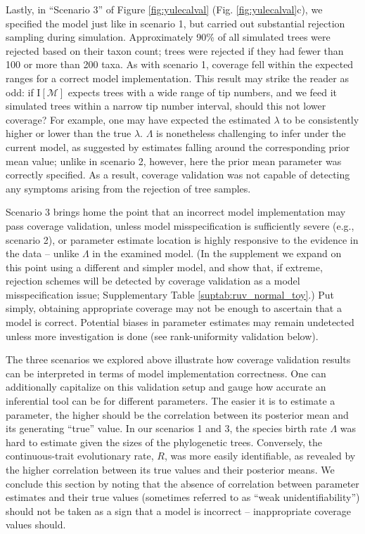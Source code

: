 \documentclass[oneside]{article}
\begin{document}
Lastly, in ``Scenario 3'' of Figure \ref{fig:yulecalval} (Fig. \ref{fig:yulecalval}c), we specified the model just like in scenario 1, but carried out substantial rejection sampling during simulation.
Approximately 90\% of all simulated trees were rejected based on their taxon count; trees were rejected if they had fewer than 100 or more than 200 taxa.
As with scenario 1, coverage fell within the expected ranges for a correct model implementation.
This result may strike the reader as odd: if $\text{I}[\mathcal{M}]$ expects trees with a wide range of tip numbers, and we feed it simulated trees within a narrow tip number interval, should this not lower coverage?
For example, one may have expected the estimated $\lambda$ to be consistently higher or lower than the true $\lambda$.
$\Lambda$ is nonetheless challenging to infer under the current model, as suggested by estimates falling around the corresponding prior mean value; unlike in scenario 2, however, here the prior mean parameter was correctly specified.
As a result, coverage validation was not capable of detecting any symptoms arising from the rejection of tree samples.

Scenario 3 brings home the point that an incorrect model implementation may pass coverage validation, unless model misspecification is sufficiently severe (e.g., scenario 2), or parameter estimate location is highly responsive to the evidence in the data -- unlike $\Lambda$ in the examined model.
(In the supplement we expand on this point using a different and simpler model, and show that, if extreme, rejection schemes will be detected by coverage validation as a model misspecification issue; Supplementary Table \ref{suptab:ruv_normal_toy}.)
Put simply, obtaining appropriate coverage may not be enough to ascertain that a model is correct.
Potential biases in parameter estimates may remain undetected unless more investigation is done (see rank-uniformity validation below).

The three scenarios we explored above illustrate how coverage validation results can be interpreted in terms of model implementation correctness.
One can additionally capitalize on this validation setup and gauge how accurate an inferential tool can be for different parameters. 
The easier it is to estimate a parameter, the higher should be the correlation between its posterior mean and its generating ``true'' value.
In our scenarios 1 and 3, the species birth rate $\Lambda$ was hard to estimate given the sizes of the phylogenetic trees.
Conversely, the continuous-trait evolutionary rate, $R$, was more easily identifiable, as revealed by the higher correlation between its true values and their posterior means.
We conclude this section by noting that the absence of correlation between parameter estimates and their true values (sometimes referred to as ``weak unidentifiability'') should not be taken as a sign that a model is incorrect -- inappropriate coverage values should.
\end{document}

